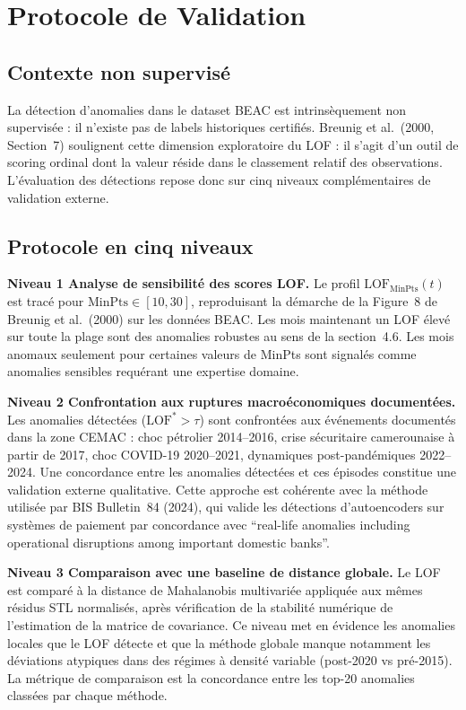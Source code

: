 \documentclass[12pt,a4paper]{article}
\begin{document}
\section{Protocole de Validation}

\subsection{Contexte non supervisé}

La détection d'anomalies dans le dataset BEAC est intrinsèquement non
supervisée : il n'existe pas de labels historiques certifiés. Breunig et al.\
(2000, Section~7) soulignent cette dimension exploratoire du LOF : il s'agit
d'un outil de scoring ordinal dont la valeur réside dans le classement relatif
des observations. L'évaluation des détections repose donc sur cinq niveaux
complémentaires de validation externe.

\subsection{Protocole en cinq niveaux}

\textbf{Niveau 1  Analyse de sensibilité des scores LOF.}
Le profil $\mathrm{LOF}_{\mathrm{MinPts}}(t)$ est tracé pour
$\mathrm{MinPts} \in [10, 30]$, reproduisant la démarche de la Figure~8
de Breunig et al.\ (2000) sur les données BEAC. Les mois maintenant un LOF
élevé sur toute la plage sont des anomalies robustes au sens de la
section~4.6. Les mois anomaux seulement pour certaines valeurs de MinPts
sont signalés comme anomalies sensibles requérant une expertise domaine.

\textbf{Niveau 2  Confrontation aux ruptures macroéconomiques documentées.}
Les anomalies détectées ($\mathrm{LOF}^* > \tau$) sont confrontées aux
événements documentés dans la zone CEMAC : choc pétrolier 2014--2016, crise
sécuritaire camerounaise à partir de 2017, choc COVID-19 2020--2021, dynamiques
post-pandémiques 2022--2024. Une concordance entre les anomalies détectées et
ces épisodes constitue une validation externe qualitative. Cette approche est
cohérente avec la méthode utilisée par BIS Bulletin~84 (2024), qui valide les
détections d'autoencoders sur systèmes de paiement par concordance avec
``real-life anomalies including operational disruptions among important domestic
banks''.

\textbf{Niveau 3  Comparaison avec une baseline de distance globale.}
Le LOF est comparé à la distance de Mahalanobis multivariée appliquée aux
mêmes résidus STL normalisés, après vérification de la stabilité numérique
de l'estimation de la matrice de covariance. Ce niveau met en évidence les
anomalies locales que le LOF détecte et que la méthode globale manque 
notamment les déviations atypiques dans des régimes à densité variable
(post-2020 vs pré-2015). La métrique de comparaison est la concordance entre
les top-20 anomalies classées par chaque méthode.
\end{document}
